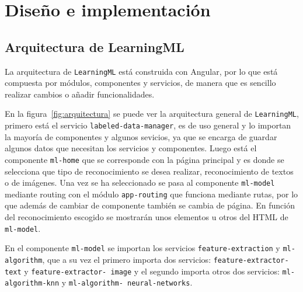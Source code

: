 \documentclass[a4paper, 12pt]{book}
\begin{document}

\cleardoublepage
\chapter{Diseño e implementación} 

\section{Arquitectura de LearningML} 
\label{sec:arquitectura}

La arquitectura de \texttt{LearningML} está construida con Angular, por lo que está compuesta por módulos, componentes y servicios, de manera que es sencillo realizar cambios o añadir funcionalidades. 

En la figura~\ref{fig:arquitectura} se puede ver la arquitectura general de \texttt{LearningML}, primero está el servicio \texttt{labeled-data-manager}, es de uso general y lo importan la mayoría de componentes y algunos sevicios, ya que se encarga de guardar  algunos datos que necesitan los servicios y componentes. 
Luego está el componente \texttt{ml-home} que se corresponde con la página principal y es donde se selecciona que tipo de reconocimiento se desea realizar, reconocimiento de textos o de imágenes. Una vez se ha seleccionado se pasa al componente \texttt{ml-model} mediante routing con el módulo \texttt{app-routing} que funciona mediante rutas, por lo que además de cambiar de componente también se cambia de página. 
En función del reconocimiento escogido se mostrarán unos elementos u otros del HTML de \texttt{ml-model}.

En el componente \texttt{ml-model} se importan los servicios \texttt{feature-extraction} y \texttt{ml-algorithm}, que a su vez el primero importa dos servicios: \texttt{feature-extractor-text} y \texttt{feature-extractor-
image} y el segundo importa otros dos servicios: \texttt{ml-algorithm-knn} y \texttt{ml-algorithm-
neural-networks}.
\end{document}
